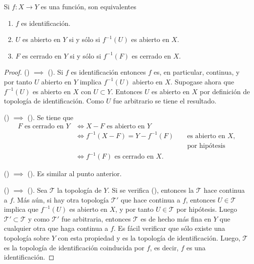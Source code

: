 
\begin{theorem}
Si $f : X \longrightarrow Y$ es una función, son equivalentes
\begin{enumerate}[label=\textnormal{(\roman*)}]
\item $f$ es identificación.
\item $U$ es abierto en $Y$ si y sólo si $f^{-1}(U)$ es abierto en $X$.
\item $F$ es cerrado en $Y$ si y sólo si $f^{-1}(F)$ es cerrado en $X$.
\end{enumerate}
\end{theorem}

\begin{proof}
({}) $\implies$ ({}).  Si $f$ es identificación entonces $f$ es, en particular, continua, y por tanto $U$ abierto en $Y$ implica $f^{-1}(U)$ abierto en $X$. Supogase ahora que $f^{-1}(U)$ es abierto en $X$ con $U \subset Y$. Entonces $U$ es abierto en $X$ por definición de topología de identificación. Como $U$ fue arbitrario se tiene el resultado.
\bigskip

({}) $\implies$ ({}). Se tiene que
\begin{align*}
    F \text{ es cerrado en } Y & \iff X - F \text{ es abierto en } Y \\
                               & \iff f^{-1}(X - F) = Y-f^{-1}(F) && \text{ es abierto en } X, \\
                               & && \text{ por hipótesis} \\
                               & \iff f^{-1}(F) \text{ es cerrado en } X.
\end{align*}

({}) $\implies$ ({}). Es similar al punto anterior.
\bigskip

({}) $\implies$ ({}). Sea $\mathcal{T}$ la topología de $Y$. Si se verifica ({}), entonces la $\mathcal{T}$ hace continua a $f$. Más aún, si hay otra topología $\mathcal{T'}$ que hace continua a $f$, entonces $U \in \mathcal{T}$ implica que $f^{-1}(U)$ es abierto en $X$, y por tanto $U \in \mathcal{T}$ por hipótesis. Luego $\mathcal{T'} \subset \mathcal{T}$ y como $\mathcal{T'}$ fue arbitraria, entonces $\mathcal{T}$ es de hecho más fina en $Y$ que cualquier otra que haga continua a $f$. Es fácil verificar que sólo existe una topología sobre $Y$ con esta propiedad y es la topología de identificación. Luego, $\mathcal{T}$ es la topología de identificación coinducida por $f$, es decir, $f$ es una identificación.
\end{proof}
